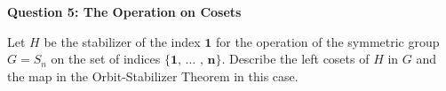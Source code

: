 \documentclass[11pt,twoside, a4paper]{report}
\theoremstyle{plain}
\theoremstyle{definition}
\begin{document}
\begin{center}
{\bf Question 5: The Operation on Cosets}
\end{center}

Let $H$ be the stabilizer of the index $\textbf{1}$ for the operation of the symmetric group $G = S_n$ on the set of indices $\{ \textbf{1, $\hdots$ ,  n} \}$.
	Describe the left cosets of $H$ in $G$ and the map in the Orbit-Stabilizer Theorem in this case. 






\end{document}
